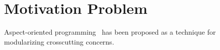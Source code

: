 \section{Motivation Problem}

Aspect-oriented programming~\citet{kiczales-ecoop-1997} has been proposed as a technique for modularizing crosscutting concerns. 
